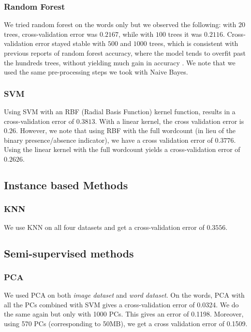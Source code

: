 \documentclass[11pt,twocolumn]{report}
\begin{document}
     \subsubsection{Random Forest}
     We tried random forest on the words only but we observed the following: with $20$ trees, cross-validation error was $0.2167$, while with $100$ trees it was $0.2116$. Cross-validation error stayed stable with $500$ and $1000$ trees, which is consistent with previous reports of random forest accuracy, where the model tends to overfit past the hundreds trees, without yielding much gain in accuracy \cite{latinne2001limiting,oshiro2012many}. We note that we used the same pre-processing steps we took with Naive Bayes.

    \subsubsection{SVM}
    Using SVM with an RBF (Radial Basis Function) kernel function, results in a cross-validation error of $0.3813$. With a linear kernel, the cross validation error is $0.26$. However, we note that using RBF with the full wordcount (in lieu of the binary presence/absence indicator), we have a cross validation error of $0.3776$. Using the linear kernel with the full wordcount yields a cross-validation error of $0.2626$.
    
    \subsection*{Instance based Methods}
    \subsubsection{KNN}
    
    We use KNN on all four datasets and get a cross-validation error of $0.3556$.
   
    \subsection*{Semi-supervised methods}
    \subsubsection*{PCA}
    We used PCA on both \textit{image dataset} and \textit{word dataset}. On the words, PCA with all the PCs combined with SVM gives a cross-validation error of 0.0324. We do the same again but only with 1000 PCs. This gives an error of 0.1198. Moreover, using 570 PCs (corresponding to 50MB), we get a cross validation error of 0.1509.\\
    
\end{document}
